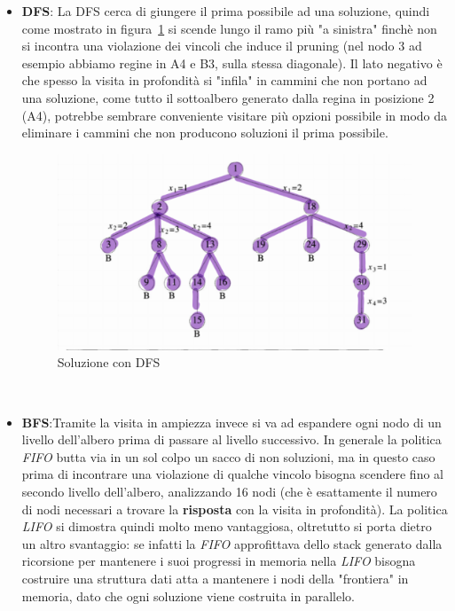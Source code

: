 \documentclass[a4paper]{article}
\begin{document}
\begin{itemize}
	\item \textbf{DFS}: La DFS cerca di giungere il prima possibile ad una soluzione, quindi come mostrato in figura~\ref{FIG:C_2_DFS} si scende lungo il ramo più "a sinistra" finchè non si incontra una violazione dei vincoli che induce il pruning (nel nodo 3 ad esempio abbiamo regine in A4 e B3, sulla stessa diagonale).
		Il lato negativo è che spesso la visita in profondità si "infila" in cammini che non portano ad una soluzione, come tutto il sottoalbero generato dalla regina in posizione 2 (A4), potrebbe sembrare conveniente visitare più opzioni possibile in modo da eliminare i cammini che non producono soluzioni il prima possibile.
\begin{figure}[!ht]
\centering
\includegraphics[width=1\textwidth]{./img/C_2_DFS.png}
\caption{Soluzione con DFS} \label{FIG:C_2_DFS}
\end{figure}\\
	\item \textbf{BFS}:Tramite la visita in ampiezza invece si va ad espandere ogni nodo di un livello dell'albero prima di passare al livello successivo.
		In generale la politica \textit{FIFO} butta via in un sol colpo un sacco di non soluzioni, ma in questo caso prima di incontrare una violazione di qualche vincolo bisogna scendere fino al secondo livello dell'albero, analizzando 16 nodi (che è esattamente il numero di nodi necessari a trovare la \textbf{risposta} con la visita in profondità).
		La politica \textit{LIFO} si dimostra quindi molto meno vantaggiosa, oltretutto si porta dietro un altro svantaggio: se infatti la \textit{FIFO} approfittava dello stack generato dalla ricorsione per mantenere i suoi progressi in memoria nella \textit{LIFO} bisogna costruire una struttura dati atta a mantenere i nodi della "frontiera" in memoria, dato che ogni soluzione viene costruita in parallelo.

\end{itemize}
\end{document}
